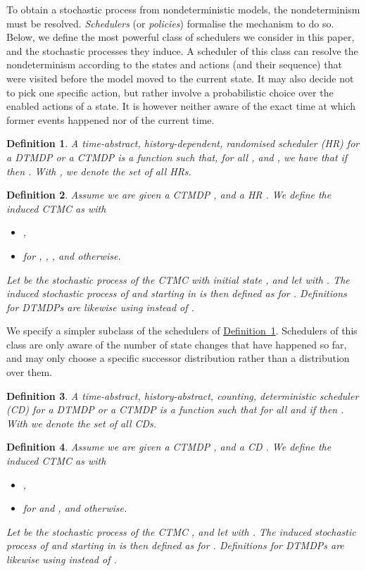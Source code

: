\documentclass[10pt,twocolumn]{article}
\newtheorem{definition}{Definition}
\newcommand{\refdef}[1]{\texorpdfstring{\hyperref[def:#1]{Definition~\ref*{def:#1}}}{Definition \ref*{def:#1}}}
\begin{document}
To obtain a stochastic process from nondeterministic models, the nondeterminism must be resolved.
\emph{Schedulers} (or \emph{policies}) formalise the mechanism to do so.
Below, we define the most powerful class of schedulers we consider in this paper, and the stochastic processes they induce.
A scheduler of this class can resolve the nondeterminism according to the states and actions (and their sequence) that were visited before the model moved to the current state.
It may also decide not to pick one specific action, but rather involve a probabilistic choice over the enabled actions of a state.
It is however neither aware of the exact time at which former events happened nor of the current time.
\begin{definition}
  \label{def:sched-hrs}
A \emph{time-abstract, history-dependent, ran\-dom\-ised scheduler (HR)} for a DTMDP
   or a CTMDP 
  is a function 
  such that, for all , and ,
  we have that if  then .
  With  , we denote the set of all HRs.
\end{definition}

\begin{definition}
  Assume we are given a CTMDP , and a HR
  . We
  define the \emph{induced CTMC} as 
  with
  \begin{itemize}
  \item ,
  \item  for , , , and  otherwise.
  \end{itemize}
Let  be the stochastic
  process of the CTMC  with initial state ,
  and let  with
  .
  The \emph{induced stochastic process}  of  and
   starting in  is then defined as
   for .
  Definitions for DTMDPs are likewise using  instead of .
\end{definition}

We specify a simpler subclass of the schedulers of \refdef{sched-hrs}.
Schedulers of this class are only aware of the number of state changes that have
happened so far, and may only choose a specific successor distribution rather
than a distribution over them.
\begin{definition}
  \label{def:sched-cd}
A \emph{time-abstract, history-abstract, counting, deterministic scheduler
  (CD)} for a DTMDP  or a CTMDP  is a function  such that for all  and  if
   then .
  With   we denote the set of all CDs.
\end{definition}

\begin{definition}
  \label{def:induced-ctmc}
  Assume we are given a CTMDP , and a CD .
  We define the \emph{induced CTMC} as  with
\begin{itemize}
  \item ,
  \item  for  and , and  otherwise.
  \end{itemize}
Let  
  be the stochastic process of the CTMC , and let  with .
  The \emph{induced stochastic process}  of  and  starting in  is then defined as  for .
  Definitions for DTMDPs are likewise using  instead of .
\end{definition}
\end{document}
